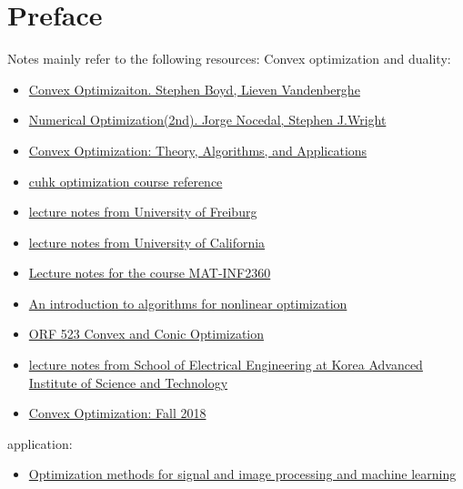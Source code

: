 \chapter*{Preface}


Notes mainly refer to the following resources:
Convex optimization and duality:
\begin{itemize}
    \item \href{https://web.stanford.edu/~boyd/cvxbook/}{Convex Optimizaiton. Stephen Boyd, Lieven Vandenberghe}
    \item \href{https://link.springer.com/book/10.1007/978-0-387-40065-5}{Numerical Optimization(2nd). Jorge Nocedal, Stephen J.Wright} 
    \item \href{https://sites.gatech.edu/ece-6270-fall-2022/}{Convex Optimization: Theory, Algorithms, and Applications}
    \item \href{https://www.math.cuhk.edu.hk/course_builder/2324/math4230/}{cuhk optimization course reference}
    \item \href{https://cdn.syscop.de/publications/Diehl2016.pdf}{lecture notes from University of Freiburg}
    \item \href{https://faculty.ucmerced.edu/mcarreira-perpinan/teaching/EECS260/lecture-notes.pdf}{lecture notes from University of California}
    \item \href{https://www.uio.no/studier/emner/matnat/math/nedlagte-emner/MAT-INF2360/v13/matinf2360part3.pdf}{Lecture notes for the course MAT-INF2360}
    \item \href{https://www.numerical.rl.ac.uk/people/nimg/msc/lectures/paper.pdf}{An introduction to algorithms for nonlinear optimization} 
    \item \href{https://www.princeton.edu/~aaa/Public/Teaching/ORF523/S16/}{ORF 523 Convex and Conic Optimization}
    \item \href{}{lecture notes from School of Electrical Engineering at Korea Advanced Institute of Science and Technology}
    \item \href{https://www.stat.cmu.edu/~ryantibs/convexopt-F18/}{Convex Optimization: Fall 2018}
\end{itemize}


application:

\begin{itemize}
    \item \href{https://web.eecs.umich.edu/~fessler/course/598/}{Optimization methods for signal and image processing and machine learning}
\end{itemize}



